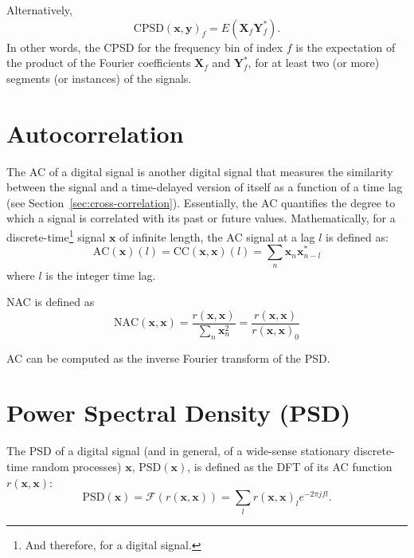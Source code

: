 Alternatively,
\begin{equation}
  \text{CPSD}(\mathbf{x},\mathbf{y})_f=E(\mathbf{X}_f\mathbf{Y}_f^*).
\end{equation}
In other words, the \gls{CPSD} for the frequency bin of index $f$ is
the expectation of the product of the Fourier coefficients
$\mathbf{X}_f$ and $\mathbf{Y}_f^*$, for at least two (or more)
segments (or instances) of the signals.


\section{Autocorrelation}
\label{sec:autocorrelation}

The \gls{AC} of a digital signal is another digital signal that
measures the similarity between the signal and a time-delayed version
of itself as a function of a time lag (see
Section~\ref{sec:cross-correlation}). Essentially, the \gls{AC}
quantifies the degree to which a signal is correlated with its past or
future values. Mathematically, for a discrete-time\footnote{And
  therefore, for a digital signal.} signal $\mathbf{x}$ of infinite
length, the \gls{AC} signal at a lag $l$ is defined as:
\begin{equation}
  \text{AC}(\mathbf{x})(l)=\text{CC}(\mathbf{x},\mathbf{x})(l)=\sum_n{\mathbf{x}}_n \mathbf{x}^*_{n-l}
\end{equation}
where $l$ is the integer time lag.

\gls{NAC} is defined as
\begin{equation}
  {\text{NAC}(\mathbf{x},\mathbf{x})} = \frac{{r(\mathbf{x},\mathbf{x})}}{\sum_n \mathbf{x}_n^2} = \frac{{r(\mathbf{x},\mathbf{x})}}{{r(\mathbf{x},\mathbf{x})}_0}
\end{equation}

\gls{AC} can be computed as the inverse Fourier transform of
the \gls{PSD}.


\section{Power Spectral Density (PSD)}
\label{sec:PSD}

The \gls{PSD} of a digital signal (and in general, of a wide-sense
stationary discrete-time random processes) $\mathbf{x}$,
$\text{PSD}(\mathbf{x})$, is defined as the \gls{DFT} of its
\gls{AC} function $r(\mathbf{x},\mathbf{x})$:
\begin{equation}
  \text{PSD}(\mathbf{x}) = \mathcal{F}(r(\mathbf{x},\mathbf{x})) = \sum_l r(\mathbf{x},\mathbf{x})_le^{-2\pi jfl}.
\end{equation}

